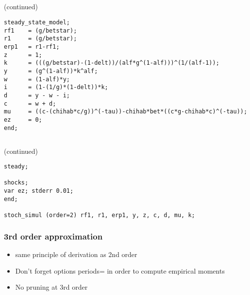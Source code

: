 \documentclass{beamer}
\begin{document}
\subsection[]{}
\begin{slide}{(continued)}
{\tiny\begin{verbatim}
steady_state_model;
rf1    = (g/betstar);
r1     = (g/betstar);
erp1   = r1-rf1;
z      = 1;
k      = (((g/betstar)-(1-delt))/(alf*g^(1-alf)))^(1/(alf-1));
y      = (g^(1-alf))*k^alf;
w      = (1-alf)*y;
i      = (1-(1/g)*(1-delt))*k;
d      = y - w - i;
c      = w + d;
mu     = ((c-(chihab*c/g))^(-tau))-chihab*bet*((c*g-chihab*c)^(-tau));
ez     = 0;
end;
\end{verbatim}
}
\end{slide}

\subsection[]{}
\begin{slide}{(continued)}
{\tiny
\begin{verbatim}
steady;                      

shocks;
var ez; stderr 0.01;  
end;

stoch_simul (order=2) rf1, r1, erp1, y, z, c, d, mu, k;
\end{verbatim}
}
\end{slide}

\begin{frame}
  \frametitle{3rd order approximation}
  \begin{itemize}
  \item same principle of derivation as 2nd order
  \item Don't forget options periods= in order to compute empirical moments
  \item No pruning at 3rd order
  \end{itemize}
\end{frame}
\end{document}
